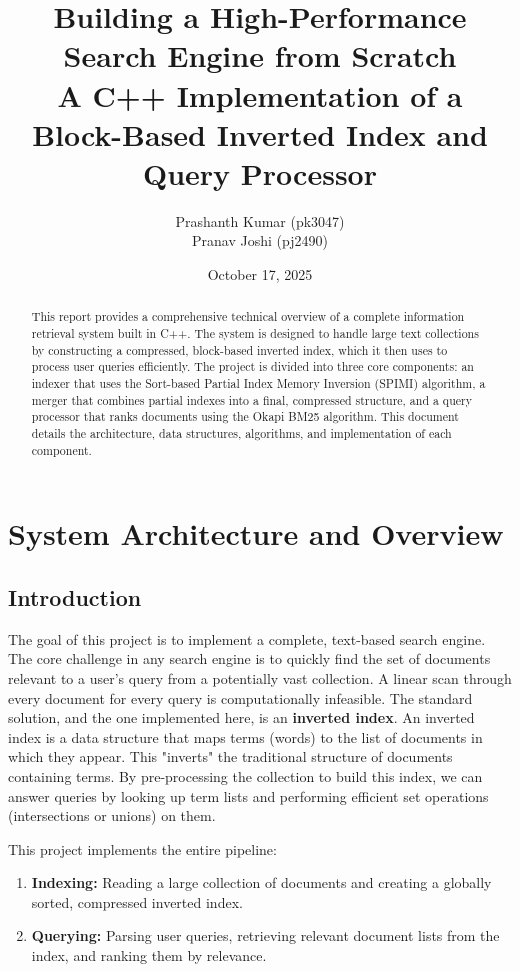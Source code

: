 \documentclass{article}
\title{\textbf{Building a High-Performance Search Engine from Scratch \\ \large A C++ Implementation of a Block-Based Inverted Index and Query Processor}}
\author{Prashanth Kumar (pk3047) \\ Pranav Joshi (pj2490)}
\date{October 17, 2025}
\begin{document}
\maketitle

\begin{abstract}
This report provides a comprehensive technical overview of a complete information retrieval system built in C++. The system is designed to handle large text collections by constructing a compressed, block-based inverted index, which it then uses to process user queries efficiently. The project is divided into three core components: an indexer that uses the Sort-based Partial Index Memory Inversion (SPIMI) algorithm, a merger that combines partial indexes into a final, compressed structure, and a query processor that ranks documents using the Okapi BM25 algorithm. This document details the architecture, data structures, algorithms, and implementation of each component.
\end{abstract}

\newpage
\tableofcontents
\newpage

\section{System Architecture and Overview}

\subsection{Introduction}
The goal of this project is to implement a complete, text-based search engine. The core challenge in any search engine is to quickly find the set of documents relevant to a user's query from a potentially vast collection. A linear scan through every document for every query is computationally infeasible. The standard solution, and the one implemented here, is an \textbf{inverted index}. An inverted index is a data structure that maps terms (words) to the list of documents in which they appear. This "inverts" the traditional structure of documents containing terms. By pre-processing the collection to build this index, we can answer queries by looking up term lists and performing efficient set operations (intersections or unions) on them.

This project implements the entire pipeline:
\begin{enumerate}
    \item \textbf{Indexing:} Reading a large collection of documents and creating a globally sorted, compressed inverted index.
    \item \textbf{Querying:} Parsing user queries, retrieving relevant document lists from the index, and ranking them by relevance.
\end{enumerate}
\end{document}
